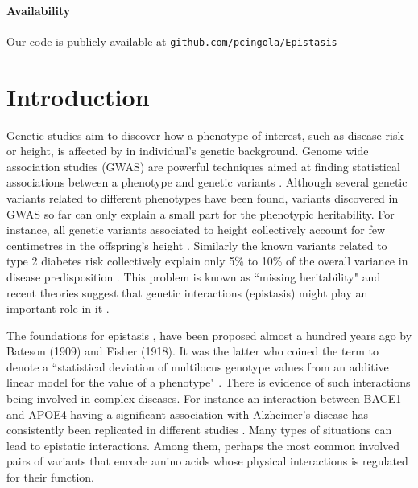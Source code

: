\paragraph{Availability} Our code is publicly available at \texttt{github.com/pcingola/Epistasis}

\section{Introduction}

Genetic studies aim to discover how a phenotype of interest, such as disease risk or height, is affected by in individual's genetic background. Genome wide association studies (GWAS) are powerful techniques aimed at finding statistical associations between a phenotype and genetic variants \cite{clarke2011basic}. Although several genetic variants related to different phenotypes have been found, variants discovered in GWAS so far can only explain a small part for the phenotypic heritability. For instance, all genetic variants associated to height collectively account for few centimetres in the offspring's height \cite{wood2014defining}. Similarly the known variants related to type 2 diabetes risk collectively explain only 5\% to 10\% of the overall variance in disease predisposition \cite{morris2012large, consortium2014genome}. This problem is known as ``missing heritability" \cite{manolio2009finding} and recent theories suggest that genetic interactions (epistasis) might play an important role in it \cite{zuk2012mystery, zuk2014searching}.

The foundations for epistasis \cite{gao2010classification}, have been proposed almost a hundred years ago by Bateson (1909) and Fisher (1918). It was the latter who coined the term to denote a ``statistical deviation of multilocus genotype values from an additive linear model for the value of a phenotype" \cite{gao2010classification}. There is evidence of such interactions being involved in complex diseases. For instance an interaction between BACE1 and APOE4 having a significant association with Alzheimer's disease has consistently been replicated in different studies \cite{combarros2009epistasis}. Many types of situations can lead to epistatic interactions. Among them, perhaps the most common involved pairs of variants that encode amino acids whose physical interactions is regulated for their function.

